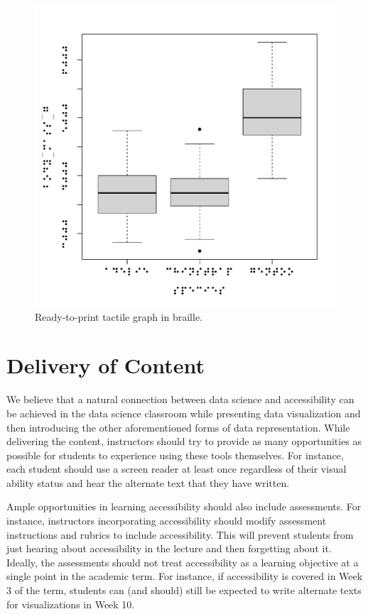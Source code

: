 \documentclass[12pt]{article}
\begin{document}
\begin{figure}

{\centering \includegraphics[height=0.5\textheight]{figure/tactile-boxplot} 

}

\caption{Ready-to-print tactile graph in braille.}\label{fig:tactile-example}
\end{figure}

\hypertarget{delivery-of-content}{%
\section{Delivery of Content}\label{delivery-of-content}}

We believe that a natural connection between data science and accessibility can be achieved in the data science classroom while presenting data visualization and then introducing the other aforementioned forms of data representation.
While delivering the content, instructors should try to provide as many opportunities as possible for students to experience using these tools themselves.
For instance, each student should use a screen reader at least once regardless of their visual ability status and hear the alternate text that they have written.

Ample opportunities in learning accessibility should also include assessments.
For instance, instructors incorporating accessibility should modify assessment instructions and rubrics to include accessibility.
This will prevent students from just hearing about accessibility in the lecture and then forgetting about it.
Ideally, the assessments should not treat accessibility as a learning objective at a single point in the academic term.
For instance, if accessibility is covered in Week 3 of the term, students can (and should) still be expected to write alternate texts for visualizations in Week 10.
\end{document}
